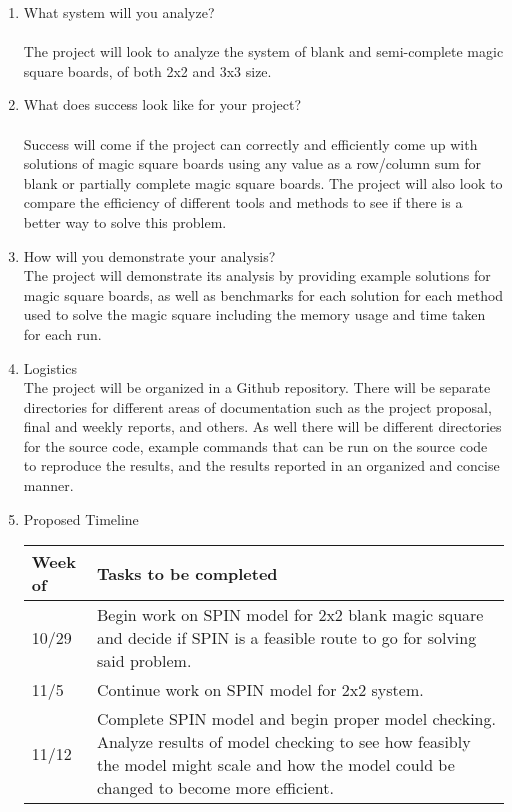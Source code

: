 \documentclass[12pt]{article}
\begin{document}
\begin{enumerate}
\\
\item What system will you analyze?\\
\\
The project will look to analyze the system of blank and semi-complete magic square boards, of both 2x2 and 3x3 size.
\\
\item What does success look like for your project?\\
\\
Success will come if the project can correctly and efficiently come up with solutions of magic square boards using any value as a row/column sum for blank or partially complete magic square boards. The project will also look to compare the efficiency of different tools and methods to see if there is a better way to solve this problem.
\\
\item How will you demonstrate your analysis?
\\
The project will demonstrate its analysis by providing example solutions for magic square boards, as well as benchmarks for each solution for each method used to solve the magic square including the memory usage and time taken for each run.
\\
\item Logistics
\\
The project will be organized in a Github repository. There will be separate directories for different areas of documentation such as the project proposal, final and weekly reports, and others. As well there will be different directories for the source code, example commands that can be run on the source code to reproduce the results, and the results reported in an organized and concise manner.
\\
\item Proposed Timeline
\\
\begin{tabular}{| l | p{10cm} |}
\hline
{\bf Week of} & {\bf Tasks to be completed} \\ \hline

10/29 & Begin work on SPIN model for 2x2 blank magic square and decide if SPIN is a feasible route to go for solving said problem. \\ \hline

11/5 & Continue work on SPIN model for 2x2 system. \\ \hline

11/12 & Complete SPIN model and begin proper model checking. Analyze results of model checking to see how feasibly the model might scale and how the model could be changed to become more efficient. \\ \hline


\end{tabular}
\end{enumerate}
\end{document}

